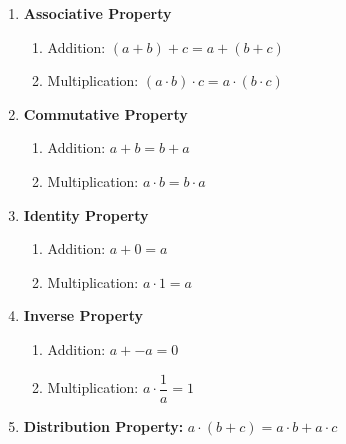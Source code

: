 \documentclass[12pt]{article}
\begin{document}
\begin{enumerate}

\item \textbf{Associative Property}

\begin{enumerate}

\item Addition: $(a+b) + c = a+ (b + c)$

\item Multiplication: $(a \cdot b) \cdot c = a \cdot (b \cdot c)$

\end{enumerate}

\item \textbf{Commutative Property}

\begin{enumerate}

\item Addition: $a+b = b + a$

\item Multiplication: $a \cdot b = b \cdot a$

\end{enumerate}

\newpage

\item \textbf{Identity Property}

\begin{enumerate}

\item Addition: $a+0 = a$

\item Multiplication: $a \cdot 1 = a$

\end{enumerate}

\item \textbf{Inverse Property}

\begin{enumerate}

\item Addition: $a+ -a = 0$

\item Multiplication: $a \cdot \dfrac{1}{a} = 1$

\end{enumerate}

\item \textbf{Distribution Property:} $a \cdot (b+c) = a \cdot b+a \cdot c$

\end{enumerate}
\end{document}
